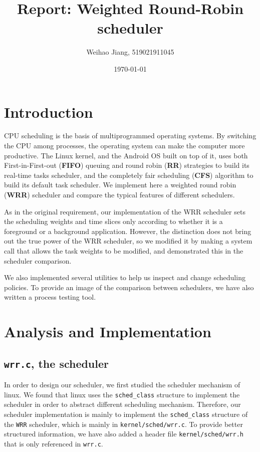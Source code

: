 \documentclass[11pt]{article}
\author{Weihao Jiang, 519021911045}
\title{Report: Weighted Round-Robin
scheduler}
\date{\today}
\begin{document}
\maketitle

\section{Introduction}\label{introduction}

CPU scheduling is the basis of multiprogrammed operating systems. By
switching the CPU among processes, the operating system can make the
computer more productive. The Linux
kernel, and the Android OS built on top of it, uses both
First-in-First-out (\textbf{FIFO}) queuing and round robin (\textbf{RR})
strategies to build its real-time tasks scheduler, and the completely
fair scheduling (\textbf{CFS}) algorithm to build its default task
scheduler. We implement here a weighted round robin (\textbf{WRR})
scheduler and compare the typical features of different schedulers.

As in the original requirement, our implementation of the WRR scheduler
sets the scheduling weights and time slices only according to whether it
is a foreground or a background application. However, the distinction
does not bring out the true power of the WRR scheduler, so we modified
it by making a system call that allows the task weights to be modified,
and demonstrated this in the scheduler comparison.

We also implemented several utilities to help us inspect and change
scheduling policies. To provide an image of the comparison between
schedulers, we have also written a process testing tool.

\section{Analysis and
Implementation}\label{analysis-and-implementation}

\subsection{\texttt{wrr.c}, the scheduler}\label{wrrc-the-scheduler}

In order to design our scheduler, we first studied the scheduler
mechanism of linux. We found that linux uses the \texttt{sched\_class}
structure to implement the scheduler in order to abstract different
scheduling mechanism. Therefore, our scheduler implementation is mainly
to implement the \texttt{sched\_class} structure of the \texttt{WRR}
scheduler, which is mainly in \texttt{kernel/sched/wrr.c}. To provide
better structured information, we have also added a header file
\texttt{kernel/sched/wrr.h} that is only referenced in \texttt{wrr.c}.
\end{document}
